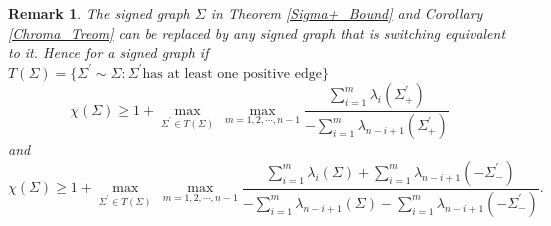 \documentclass[12pt]{article}
\theoremstyle{plain}
\newtheorem*{remark}{Remark}
\numberwithin{equation}{section}
\begin{document}
	\begin{remark}\label{Chrom_Num_Gen}
		The signed graph $\Sigma$ in Theorem \ref{Sigma+_Bound} and Corollary \ref{Chroma_Treom} can be replaced by any signed graph that is switching equivalent to it. Hence for a signed graph if $T(\Sigma)= \{ \Sigma^{'} \sim \Sigma: \Sigma^{'} \text{has at least one positive edge} \}$
		$$\chi(\Sigma)\geq  1+ \max_{\Sigma^\prime \in T(\Sigma)}~\max_{m=1, 2, \cdots, n-1} \frac{\sum_{i=1}^{m}\lambda_{i}(\Sigma^{'}_+)}{-\sum_{i=1}^{m}\lambda_{n-i+1}(\Sigma^\prime_+)}$$
		and $$\chi(\Sigma)\geq  1+ \max_{\Sigma^\prime \in T(\Sigma)}~\max_{m=1, 2, \cdots, n-1} \frac{\sum_{i=1}^{m}\lambda_{i}(\Sigma)+\sum_{i=1}^{m}\lambda_{n-i+1}(-\Sigma^\prime_-)}{-\sum_{i=1}^{m}\lambda_{n-i+1}(\Sigma)-\sum_{i=1}^{m}\lambda_{n-i+1}(-\Sigma^\prime_-)}.$$
	\end{remark}
	
	
\end{document}
